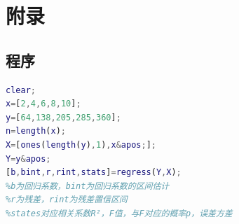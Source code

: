 \documentclass[UTF8,12pt,a4paper]{article}
\begin{document}
\begin{thebibliography}{2}
\end{thebibliography}



\section*{附录}

\subsection{程序}
\begin{lstlisting}[language={Matlab},morekeywords={regress}]
clear;
x=[2,4,6,8,10];
y=[64,138,205,285,360];
n=length(x);
X=[ones(length(y),1),x&apos;];
Y=y&apos;
[b,bint,r,rint,stats]=regress(Y,X);
%b为回归系数，bint为回归系数的区间估计
%r为残差，rint为残差置信区间
%states对应相关系数R²，F值，与F对应的概率p，误差方差
\end{lstlisting}
\end{document}
